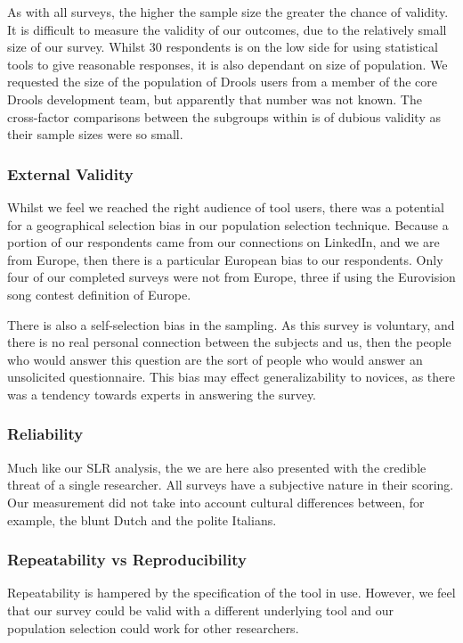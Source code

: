 As with all surveys, the higher the sample size the greater the chance of validity.
It is difficult to measure the validity of our outcomes, due to the relatively small size of our survey.
Whilst 30 respondents is on the low side for using statistical tools to give reasonable responses, it is also dependant on size of population.
We requested the size of the population of Drools users from a member of the core Drools development team, but apparently that number was not known.
The cross-factor comparisons between the subgroups within is of dubious validity as their sample sizes were so small.

\subsubsection{External Validity}
Whilst we feel we reached the right audience of tool users, there was a potential for a geographical selection bias in our population selection technique.
Because a portion of our respondents came from our connections on LinkedIn, and we are from Europe, then there is a particular European bias to our respondents.
Only four of our completed surveys were not from Europe, three if using the Eurovision song contest definition of Europe.

There is also a self-selection bias in the sampling. 
As this survey is voluntary, and there is no real personal connection between the subjects and us, then the people who would answer this question are the sort of people who would answer an unsolicited questionnaire.
This bias may effect generalizability to novices, as there was a tendency towards experts in answering the survey.

\subsubsection{Reliability}
Much like our SLR analysis, the we are here also presented with the credible threat of a single researcher.
All surveys have a subjective nature in their scoring.
Our measurement did not take into account cultural differences between, for example, the blunt Dutch and the polite Italians.

\subsubsection{Repeatability vs Reproducibility}
Repeatability is hampered by the specification of the tool in use.
However, we feel that our survey could be valid with a different underlying tool and our population selection could work for other researchers.

